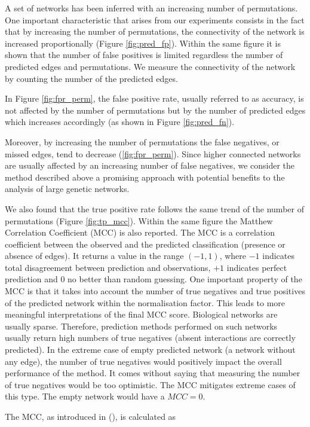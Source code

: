 A set of networks has been inferred with an increasing number of permutations. One important characteristic that arises from our experiments consists in the fact that by increasing the number of permutations, the connectivity of the network is increased proportionally (Figure \ref{fig:pred_fp}). Within the same figure it is shown that the number of false positives is limited regardless the number of predicted edges and permutations.   
We measure the connectivity of the network by counting the number of the predicted edges. 

In Figure \ref{fig:fpr_perm}, the false positive rate, usually referred to as accuracy, is not affected by the number of permutations but by the number of predicted edges which increases accordingly (as shown in Figure \ref{fig:pred_fn}). 

Moreover, by increasing the number of permutations the false negatives, or missed edges, tend to decrease (\ref{fig:fpr_perm}). Since higher connected networks are usually affected by an increasing number of false negatives, we consider the method described above a promising approach with potential benefits to the analysis of large genetic networks. 

We also found that the true positive rate follows the same trend of the number of permutations (Figure \ref{fig:tp_mcc}). Within the same figure the Matthew Correlation Coefficient (MCC) is also reported. The MCC is a correlation coefficient between the observed and the predicted classification (presence or absence of edges). It returns a value in the range $(-1, 1)$, where $-1$ indicates total disagreement between prediction and observations, $+1$ indicates perfect prediction and $0$ no better than random guessing.
One important property of the MCC is that it takes into account the number of true negatives and true positives of the predicted network within the normalisation factor. This leads to more meaningful interpretations of the final MCC score. Biological networks are usually sparse. Therefore, prediction methods performed on such networks usually return high numbers of true negatives (absent interactions are correctly predicted). 
In the extreme case of empty predicted network (a network without any edge), the number of true negatives would positively impact the overall performance of the method. It comes without saying that measuring the number of true negatives would be too optimistic. The MCC mitigates extreme cases of this type. The empty network would have a $MCC = 0$. 

The MCC, as introduced in (\citealp{Matthews1975}), is calculated as 

